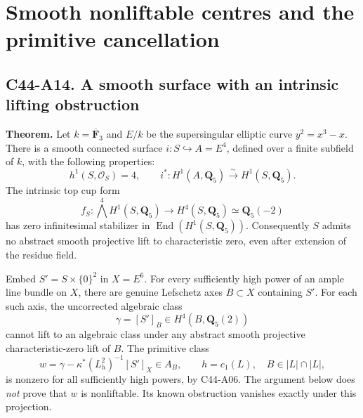 \documentclass[11pt]{article}
\theoremstyle{remark}\newtheorem{remark}[theorem]{Remark}
\begin{document}

\section{Smooth nonliftable centres and the primitive cancellation}
\subsection*{C44-A14. A smooth surface with an intrinsic lifting obstruction}

\textbf{Theorem.}
Let $k=\overline{\mathbf F}_3$ and $E/k$ be the supersingular elliptic
curve $y^2=x^3-x$. There is a smooth connected surface
$i:S\hookrightarrow A=E^4$, defined over a finite subfield of $k$,
with the following properties:
\[
 h^1(S,\mathcal O_S)=4,\qquad
 i^*:H^1(A,\mathbf Q_5)\xrightarrow{\sim}H^1(S,\mathbf Q_5).
                                                               \tag{A14.1}
\]
The intrinsic top cup form
\[
 f_S:\bigwedge^4 H^1(S,\mathbf Q_5)\longrightarrow
                 H^4(S,\mathbf Q_5)\simeq\mathbf Q_5(-2)
                                                               \tag{A14.2}
\]
has zero infinitesimal stabilizer in
$\operatorname{End}(H^1(S,\mathbf Q_5))$. Consequently $S$ admits
no abstract smooth projective lift to characteristic zero, even
after extension of the residue field.

Embed $S'=S\times\{0\}^2$ in $X=E^6$. For every sufficiently high
power of an ample line bundle on $X$, there are genuine Lefschetz
axes $B\subset X$ containing $S'$. For each such axis, the
uncorrected algebraic class
\[
                   \gamma=[S']_B\in H^4(B,\mathbf Q_5(2))
                                                               \tag{A14.3}
\]
cannot lift to an algebraic class under any abstract smooth
projective characteristic-zero lift of $B$. The primitive class
\[
 w=\gamma-\kappa^*(L_h^2)^{-1}[S']_X\in A_B,
 \qquad h=c_1(L),\quad B\in|L|\cap|L|,                         \tag{A14.4}
\]
is nonzero for all sufficiently high powers, by C44-A06.
The argument below does \emph{not} prove that $w$ is nonliftable.
Its known obstruction vanishes exactly under this projection.
\end{document}

